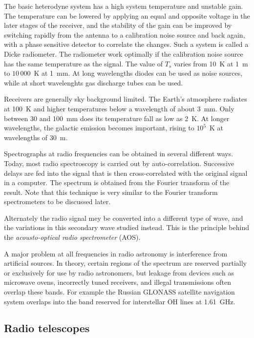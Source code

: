 The basic heterodyne system has a high system temperature and unstable gain.
The temperature can be lowered by applying an equal and opposite voltage in the
later stages of the receiver, and the stability of the gain can be improved by
switching rapidly from the antenna to a calibration noise source and back again, 
with a phase sensitive detector to correlate the changes. Such a system is called 
a Dicke radiometer. The radiometer work optimally if the calibration noise source
has the same temperature as the signal. The value of $T_s$ varies from 10~K at 
1~m to $10\,000$~K at 1~mm. At long wavelengths diodes can be used as noise 
sources, while at short wavelenghts gas discharge tubes can be used.

Receivers are generally sky background limited. The Earth's atmosphere 
radiates at 100~K and higher temperatures below a wavelength of about
3~mm. Only between 30 and 100~mm does its temperature fall as low as 
2~K. At longer wavelengths, the galactic emission becomes important, rising
to $10^5$~K at wavelengths of 30~m.

Spectrographs at radio frequencies can be obtained in several different ways. 
Today, most radio spectroscopy is carried out by auto-correlation. Successive
delays are fed into the signal that is then cross-correlated with the original
signal in a computer. The spectrum is obtained from the Fourier transform
of the result. Note that this technique is very similar to the Fourier
transform spectrometers to be discussed later.

Alternately the radio signal mey be converted into a different type of
wave, and the variations in this secondary wave studied instead. This
is the principle behind the {\it acousto-optical radio spectrometer} (AOS).

A major problem at all frequencies in radio astronomy is interference from
artificial sources. In theory, certain regions of the spectrum are reserved
partially or exclusively for use by radio astronomers, but leakage from
devices such as microwave ovens, incorrectly tuned receivers, and illegal 
transmissions often overlap these bands. For example the Russian GLONASS
satellite navigation system overlaps into the band reserved for interstellar
OH lines at 1.61~GHz.

\subsection{Radio telescopes} %

